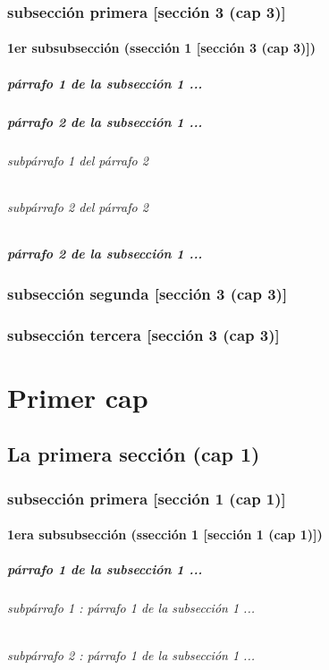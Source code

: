 \documentclass[12pt,a4paper]{report}
\begin{document}
\subsection*{subsección primera [sección 3 (cap 3)]}
\subsubsection*{1er subsubsección (ssección 1 [sección 3 (cap 3)])}
\paragraph*{párrafo 1 de la subsección 1 ...}
\paragraph*{párrafo 2 de la subsección 1 ...}
\subparagraph*{subpárrafo 1 del párrafo 2}
\subparagraph*{subpárrafo 2 del párrafo 2}
\paragraph*{párrafo 2 de la subsección 1 ...}
\subsection*{subsección segunda [sección 3 (cap 3)]}
\subsection*{subsección tercera [sección 3 (cap 3)]}


\appendix
\chapter{Primer cap}
\section{La primera sección (cap 1)}
\subsection{subsección primera [sección 1 (cap 1)]}
\subsubsection{1era subsubsección (ssección 1 [sección 1 (cap 1)])}
\paragraph{párrafo 1 de la subsección 1 ...}
\subparagraph{subpárrafo 1 : párrafo 1 de la subsección 1 ...}
\subparagraph{subpárrafo 2 : párrafo 1 de la subsección 1 ...}
\end{document}
